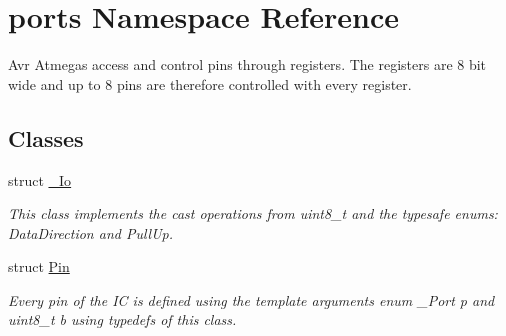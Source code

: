 \hypertarget{namespaceports}{}\section{ports Namespace Reference}
\label{namespaceports}


Avr Atmegas access and control pins through registers. The registers are 8 bit wide and up to 8 pins are therefore controlled with every register.  


\subsection*{Classes}
\begin{DoxyCompactItemize}
\item 
struct \hyperlink{structports_1_1__Io}{\+\_\+\+Io}
\begin{DoxyCompactList}\small\item\em This class implements the cast operations from uint8\+\_\+t and the typesafe enums\+: Data\+Direction and Pull\+Up. \end{DoxyCompactList}\item 
struct \hyperlink{structports_1_1Pin}{Pin}
\begin{DoxyCompactList}\small\item\em Every pin of the IC is defined using the template arguments {\ttfamily enum \+\_\+\+Port p} and {\ttfamily uint8\+\_\+t b} using {\ttfamily typedef}s of this class. \end{DoxyCompactList}\end{DoxyCompactItemize}
